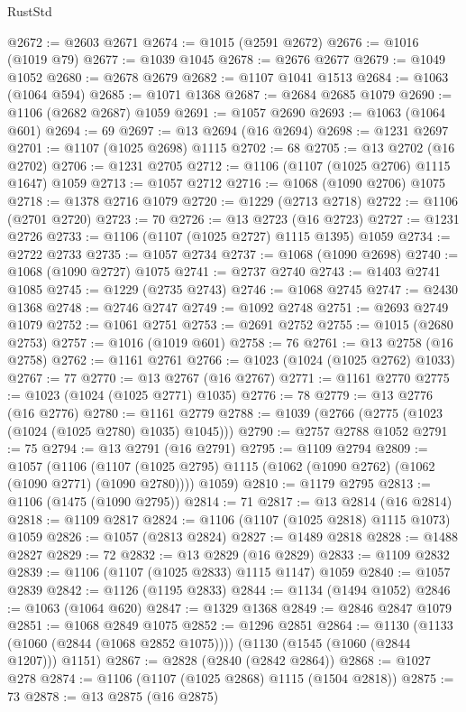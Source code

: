 \begin{lexlean}{RustStd}
\begin{coremodule}
{\begin{coremodule}
{{{{{{{{{{{{{{{{{{{{{{{{{{{{{{{{{{{@2672 := @2603 @2671
@2674 := @1015 (@2591 @2672)
@2676 := @1016 (@1019 @79)
@2677 := @1039 @1045
@2678 := @2676 @2677
@2679 := @1049 @1052
@2680 := @2678 @2679
@2682 := @1107 @1041 @1513
@2684 := @1063 (@1064 @594)
@2685 := @1071 @1368
@2687 := @2684 @2685 @1079
@2690 := @1106 (@2682 @2687) @1059
@2691 := @1057 @2690
@2693 := @1063 (@1064 @601)
@2694 := 69
@2697 := @13 @2694 (@16 @2694)
@2698 := @1231 @2697
@2701 := @1107 (@1025 @2698) @1115
@2702 := 68
@2705 := @13 @2702 (@16 @2702)
@2706 := @1231 @2705
@2712 := @1106 (@1107 (@1025 @2706) @1115 @1647) @1059
@2713 := @1057 @2712
@2716 := @1068 (@1090 @2706) @1075
@2718 := @1378 @2716 @1079
@2720 := @1229 (@2713 @2718)
@2722 := @1106 (@2701 @2720)
@2723 := 70
@2726 := @13 @2723 (@16 @2723)
@2727 := @1231 @2726
@2733 := @1106 (@1107 (@1025 @2727) @1115 @1395) @1059
@2734 := @2722 @2733
@2735 := @1057 @2734
@2737 := @1068 (@1090 @2698)
@2740 := @1068 (@1090 @2727) @1075
@2741 := @2737 @2740
@2743 := @1403 @2741 @1085
@2745 := @1229 (@2735 @2743)
@2746 := @1068 @2745
@2747 := @2430 @1368
@2748 := @2746 @2747
@2749 := @1092 @2748
@2751 := @2693 @2749 @1079
@2752 := @1061 @2751
@2753 := @2691 @2752
@2755 := @1015 (@2680 @2753)
@2757 := @1016 (@1019 @601)
@2758 := 76
@2761 := @13 @2758 (@16 @2758)
@2762 := @1161 @2761
@2766 := @1023 (@1024 (@1025 @2762) @1033)
@2767 := 77
@2770 := @13 @2767 (@16 @2767)
@2771 := @1161 @2770
@2775 := @1023 (@1024 (@1025 @2771) @1035)
@2776 := 78
@2779 := @13 @2776 (@16 @2776)
@2780 := @1161 @2779
@2788 := @1039 (@2766 (@2775 (@1023 (@1024 (@1025 @2780) @1035) @1045)))
@2790 := @2757 @2788 @1052
@2791 := 75
@2794 := @13 @2791 (@16 @2791)
@2795 := @1109 @2794
@2809 := @1057
    (@1106
      (@1107 (@1025 @2795) @1115 (@1062 (@1090 @2762) (@1062 (@1090 @2771) (@1090 @2780))))
      @1059)
@2810 := @1179 @2795
@2813 := @1106 (@1475 (@1090 @2795))
@2814 := 71
@2817 := @13 @2814 (@16 @2814)
@2818 := @1109 @2817
@2824 := @1106 (@1107 (@1025 @2818) @1115 @1073) @1059
@2826 := @1057 (@2813 @2824)
@2827 := @1489 @2818
@2828 := @1488 @2827
@2829 := 72
@2832 := @13 @2829 (@16 @2829)
@2833 := @1109 @2832
@2839 := @1106 (@1107 (@1025 @2833) @1115 @1147) @1059
@2840 := @1057 @2839
@2842 := @1126 (@1195 @2833)
@2844 := @1134 (@1494 @1052)
@2846 := @1063 (@1064 @620)
@2847 := @1329 @1368
@2849 := @2846 @2847 @1079
@2851 := @1068 @2849 @1075
@2852 := @1296 @2851
@2864 := @1130
    (@1133 (@1060 (@2844 (@1068 @2852 @1075))))
    (@1130 (@1545 (@1060 (@2844 @1207))) @1151)
@2867 := @2828 (@2840 (@2842 @2864))
@2868 := @1027 @278
@2874 := @1106 (@1107 (@1025 @2868) @1115 (@1504 @2818))
@2875 := 73
@2878 := @13 @2875 (@16 @2875)
}}}}}}}}}}}}}}}}}}}}}}}}}}}}}}}}}}}
\end{coremodule}}
\end{coremodule}
\end{lexlean}
